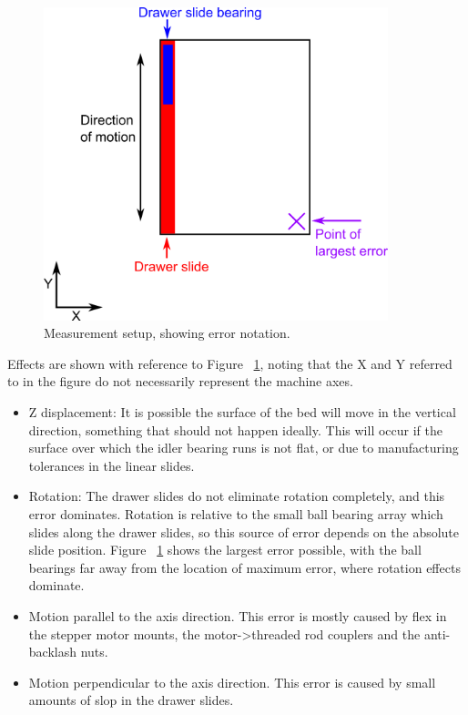 \begin{figure}[ht!]
\centering
\includegraphics[width=100mm]{resources/errors.png}
\caption{Measurement setup, showing error notation.}
\label{errornotation}
\end{figure}

Effects are shown with reference to Figure ~\ref{errornotation}, noting that the X and Y referred to in the figure do not necessarily represent the machine axes.
\begin{itemize} \itemsep0em
	\item	Z displacement: It is possible the surface of the bed will move in the vertical direction, something that should not happen ideally. This 
			will occur if the surface over which the idler bearing runs is not flat, or due to manufacturing tolerances in the linear slides.
	\item	Rotation: The drawer slides do not eliminate rotation completely, and this error dominates. Rotation is relative to the small ball bearing array which slides along
			the drawer slides, so this source of error depends on the absolute slide position. Figure ~\ref{errornotation} shows the largest error possible, with the ball bearings
			far away from the location of maximum error, where rotation effects dominate.
	\item	Motion parallel to the axis direction. This error is mostly caused by flex in the stepper motor mounts, the motor-\textgreater threaded rod couplers and the anti-backlash nuts.
	\item	Motion perpendicular to the axis direction. This error is caused by small amounts of slop in the drawer slides.
\end{itemize}

